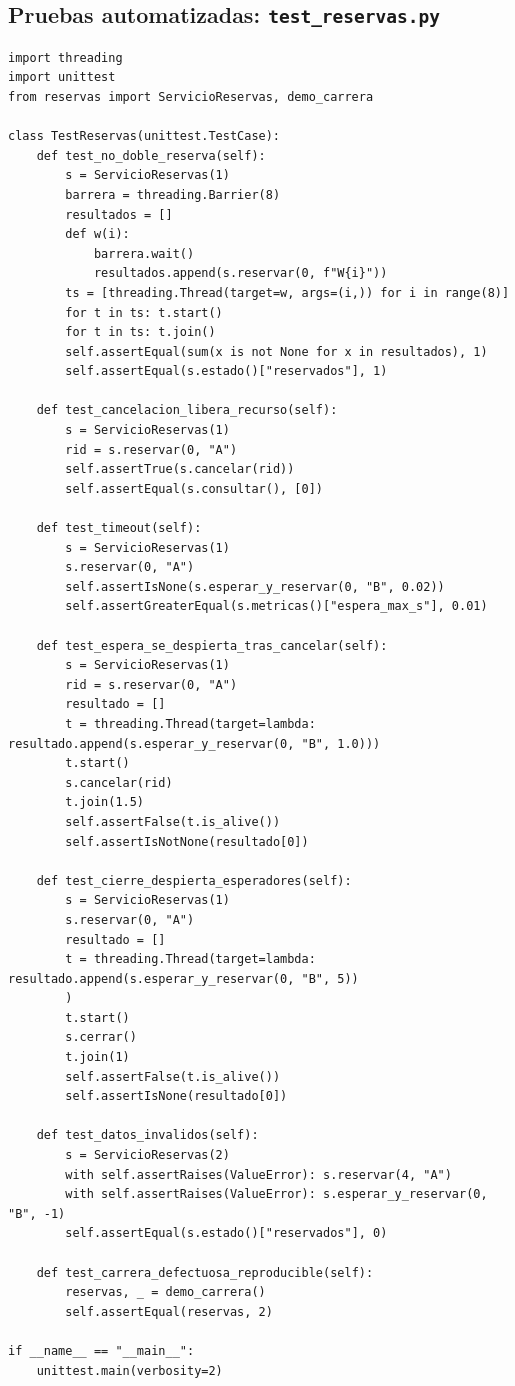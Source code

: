 \documentclass[12pt,a4paper]{article}
\begin{document}
\subsection{Pruebas automatizadas: \texttt{test\_reservas.py}}
\begin{lstlisting}[style=pycode]
import threading
import unittest
from reservas import ServicioReservas, demo_carrera

class TestReservas(unittest.TestCase):
    def test_no_doble_reserva(self):
        s = ServicioReservas(1)
        barrera = threading.Barrier(8)
        resultados = []
        def w(i):
            barrera.wait()
            resultados.append(s.reservar(0, f"W{i}"))
        ts = [threading.Thread(target=w, args=(i,)) for i in range(8)]
        for t in ts: t.start()
        for t in ts: t.join()
        self.assertEqual(sum(x is not None for x in resultados), 1)
        self.assertEqual(s.estado()["reservados"], 1)

    def test_cancelacion_libera_recurso(self):
        s = ServicioReservas(1)
        rid = s.reservar(0, "A")
        self.assertTrue(s.cancelar(rid))
        self.assertEqual(s.consultar(), [0])

    def test_timeout(self):
        s = ServicioReservas(1)
        s.reservar(0, "A")
        self.assertIsNone(s.esperar_y_reservar(0, "B", 0.02))
        self.assertGreaterEqual(s.metricas()["espera_max_s"], 0.01)

    def test_espera_se_despierta_tras_cancelar(self):
        s = ServicioReservas(1)
        rid = s.reservar(0, "A")
        resultado = []
        t = threading.Thread(target=lambda: resultado.append(s.esperar_y_reservar(0, "B", 1.0)))
        t.start()
        s.cancelar(rid)
        t.join(1.5)
        self.assertFalse(t.is_alive())
        self.assertIsNotNone(resultado[0])

    def test_cierre_despierta_esperadores(self):
        s = ServicioReservas(1)
        s.reservar(0, "A")
        resultado = []
        t = threading.Thread(target=lambda: resultado.append(s.esperar_y_reservar(0, "B", 5))
        )
        t.start()
        s.cerrar()
        t.join(1)
        self.assertFalse(t.is_alive())
        self.assertIsNone(resultado[0])

    def test_datos_invalidos(self):
        s = ServicioReservas(2)
        with self.assertRaises(ValueError): s.reservar(4, "A")
        with self.assertRaises(ValueError): s.esperar_y_reservar(0, "B", -1)
        self.assertEqual(s.estado()["reservados"], 0)

    def test_carrera_defectuosa_reproducible(self):
        reservas, _ = demo_carrera()
        self.assertEqual(reservas, 2)

if __name__ == "__main__":
    unittest.main(verbosity=2)

\end{lstlisting}
\end{document}
